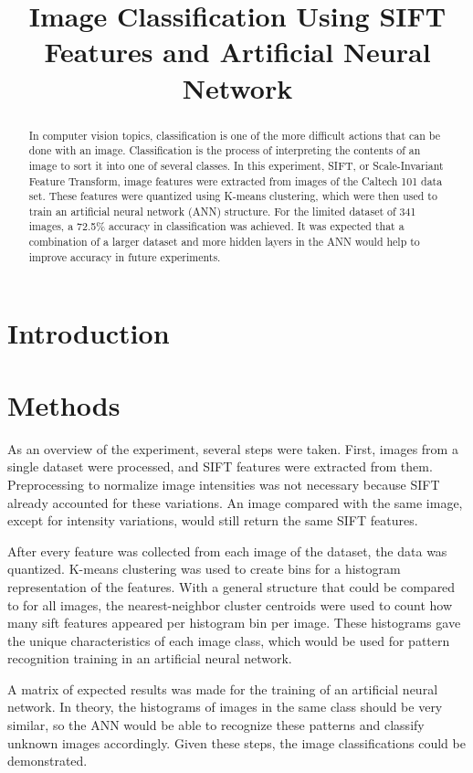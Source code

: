 \documentclass{article}
\title{Image Classification Using SIFT Features and Artificial Neural Network}
\begin{document}
%
\maketitle
%
\begin{abstract}
In computer vision topics, classification is one of the more difficult actions that can be done with an image. Classification is the process of interpreting the contents of an image to sort it into one of several classes. In this experiment, SIFT, or Scale-Invariant Feature Transform, image features were extracted from images of the Caltech 101 data set. These features were quantized using K-means clustering, which were then used to train an artificial neural network (ANN) structure. For the limited dataset of 341 images, a 72.5\% accuracy in classification was achieved. It was expected that a combination of a larger dataset and more hidden layers in the ANN would help to improve accuracy in future experiments.
\end{abstract}
%
\section{Introduction}
\label{sec:intro}
%
\section{Methods}
\label{sec:methods}
As an overview of the experiment, several steps were taken. First, images from a single dataset were processed, and SIFT features were extracted from them. Preprocessing to normalize image intensities was not necessary because SIFT already accounted for these variations. An image compared with the same image, except for intensity variations, would still return the same SIFT features.

After every feature was collected from each image of the dataset, the data was quantized. K-means clustering was used to create bins for a histogram representation of the features. With a general structure that could be compared to for all images, the nearest-neighbor cluster centroids were used to count how many sift features appeared per histogram bin per image. These histograms gave the unique characteristics of each image class, which would be used for pattern recognition training in an artificial neural network.

A matrix of expected results was made for the training of an artificial neural network. In theory, the histograms of images in the same class should be very similar, so the ANN would be able to recognize these patterns and classify unknown images accordingly. Given these steps, the image classifications could be demonstrated.
%
\end{document}
